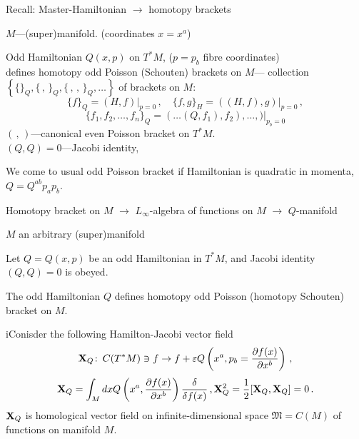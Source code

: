 \documentclass{beamer}
\def\vare {\varepsilon}
\def\p{\partial}
\def\vare{{\varepsilon}}
\def\M {{\mathfrak M}}
\def\p {\partial}
\def \X   {{\bf X}}
\begin{document}
\begin{frame}{Recall: Master-Hamiltonian $\to$ homotopy brackets }


\centerline  {$M$---(super)manifold. (coordinates $x=x^a$)}

\smallskip

Odd  Hamiltonian $Q(x,p)$ on $ T^*M$, ($p=p_b$ fibre coordinates) 
\\
defines homotopy odd Poisson (Schouten)  brackets on $M$---
   collection 
$\left\{\{\}_Q, \{\,,\,\}_Q, \{\,,\,,\,\}_Q,\dots\right\}$ 
of brackets on $M$:
                  $$
   \{f\}_Q=(H,f)\big\vert_{p=0}\,,\quad
   \{f,g\}_H=\left(\left(H,f\right),g\right)\big\vert_{p=0}\,,
                 $$
                 $$
      \{f_1,f_2,\dots,f_n\}_Q=
(\dots(Q,f_1),f_2),\dots,)\big\vert_{p_b=0}
                 $$
$(\,,\,)$---canonical even Poisson
bracket on $T^*M$.\\
$(Q,Q)=0$---Jacobi identity, 
\medskip
  
We come to usual odd Poisson bracket if Hamiltonian is quadratic in
momenta, $Q=Q^{ab}p_ap_b$.


\end{frame}

\begin{frame} {Homotopy bracket on $M$ $\to$ $L_\infty$-algebra of functions
on $M$ $\to$ $Q$-manifold}

\centerline  {$M$ an arbitrary (super)manifold}

\smallskip

 Let $Q=Q(x,p)$ be an odd  
Hamiltonian in $T^*M$, and Jacobi identity 
$(Q,Q)=0$ is obeyed.

The odd Hamiltonian $Q$  defines homotopy odd Poisson (homotopy Schouten)
bracket on $M$.  

iConisder the following Hamilton-Jacobi vector field
             $$
\X_Q\colon \,C(T^*M)\ni f\to f+\vare   Q\left(x^a, p_b={\p f(x)
\over \p x^b}\right)\,,
          $$
            $$
 \X_Q=\int_M dx Q\left(x^a, {\p f(x)
\over \p x^b}\right){\delta\over \delta f(x)}\,, 
\X_Q^2={1\over 2}[\X_Q,\X_Q]=0\,.
            $$
$\X_Q$ is homological vector field on infinite-dimensional space
$\M=C(M)$ of functions on manifold $M$.

\end{frame}
\end{document}
